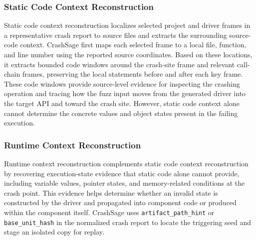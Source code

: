 \documentclass[pdflatex,sn-basic]{sn-jnl}%
\theoremstyle{thmstyleone}%
\theoremstyle{thmstyletwo}%
\theoremstyle{thmstylethree}%
\begin{document}
\subsubsection{Static Code Context Reconstruction}
Static code context reconstruction localizes selected project and driver frames in a representative crash report to source files and extracts the surrounding source-code context.
CrashSage first maps each selected frame to a local file, function, and line number using the reported source coordinates.
Based on these locations, it extracts bounded code windows around the crash-site frame and relevant call-chain frames, preserving the local statements before and after each key frame.
These code windows provide source-level evidence for inspecting the crashing operation and tracing how the fuzz input moves from the generated driver into the target API and toward the crash site.
However, static code context alone cannot determine the concrete values and object states present in the failing execution.

\subsubsection{Runtime Context Reconstruction}
Runtime context reconstruction complements static code context reconstruction by recovering execution-state evidence that static code alone cannot provide, including variable values, pointer states, and memory-related conditions at the crash point.
This evidence helps determine whether an invalid state is constructed by the driver and propagated into component code or produced within the component itself.
CrashSage uses \texttt{artifact\_path\_hint} or \texttt{base\_unit\_hash} in the normalized crash report to locate the triggering seed and stage an isolated copy for replay.
\end{document}
